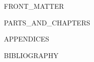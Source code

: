 \documentclass[11pt,letterpaper,openany]{book}
\numberwithin{equation}{chapter}
\numberwithin{figure}{chapter}
\numberwithin{table}{chapter}
\theoremstyle{darktheorem}
\theoremstyle{darkremark}
\begin{document}
\frontmatter
{}

{{FRONT_MATTER}}

{
\hypersetup{linkcolor=steelblue}
\tableofcontents
}
\clearpage

\mainmatter
{}

{{PARTS_AND_CHAPTERS}}

\backmatter

{{APPENDICES}}

{{BIBLIOGRAPHY}}

\printindex
\end{document}

